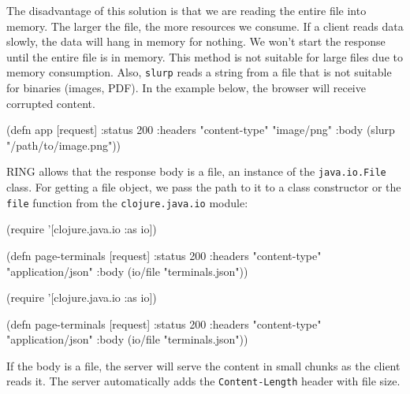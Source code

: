 \fi

The disadvantage of this solution is that we are reading the entire file into memory. The larger the file, the more resources we consume. If a client reads data slowly, the data will hang in memory for nothing. We won't start the response until the entire file is in memory. This method is not suitable for large files due to memory consumption. Also, \verb|slurp| reads a string from a file that is not suitable for binaries (images, PDF). In the example below, the browser will receive corrupted content.

\begin{english}
  \begin{clojure}
(defn app [request]
  {:status 200
   :headers {"content-type" "image/png"}
   :body (slurp "/path/to/image.png")})
  \end{clojure}
\end{english}


RING allows that the response body is a file, an instance of the \verb|java.io.File| class. For getting a file object, we pass the path to it to a class constructor or the \verb|file| function from the \verb|clojure.java.io| module:

\ifx\DEVICETYPE\MOBILE

\begin{english}
  \begin{clojure}
(require '[clojure.java.io :as io])

(defn page-terminals
  [request]
  {:status 200
   :headers
   {"content-type" "application/json"}
   :body (io/file "terminals.json")})
  \end{clojure}
\end{english}

\else

\begin{english}
  \begin{clojure}
(require '[clojure.java.io :as io])

(defn page-terminals
  [request]
  {:status 200
   :headers {"content-type" "application/json"}
   :body (io/file "terminals.json")})
  \end{clojure}
\end{english}

\fi


If the body is a file, the server will serve the content in small chunks as the client reads it. The server automatically adds the \verb|Content-Length| header with file size.

